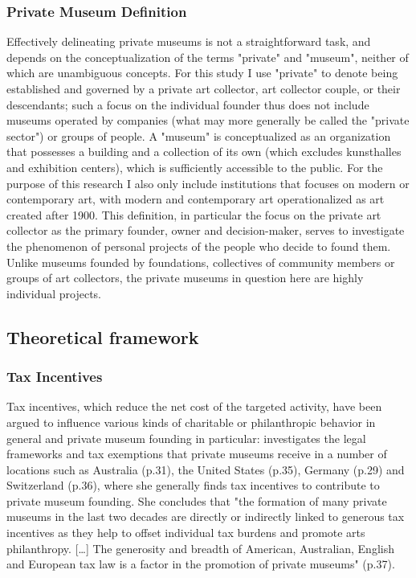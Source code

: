 \documentclass[11pt, authoryear]{elsarticle}
\begin{document}
\subsubsection*{Private Museum Definition}

Effectively delineating private museums is not a straightforward task, and depends on the conceptualization of the terms "private" and "museum", neither of which are unambiguous concepts.
For this study I use "private" to denote being established and governed by a private art collector, art collector couple, or their descendants; such a focus on the individual founder thus does not include museums operated by companies (what may more generally be called the "private sector") or groups of people.
A "museum" is conceptualized as an organization that possesses a building and a collection of its own (which excludes kunsthalles and exhibition centers), which is sufficiently accessible to the public.
For the purpose of this research I also only include institutions that focuses on modern or contemporary art, with modern and contemporary art operationalized as art created after 1900.
This definition, in particular the focus on the private art collector as the primary founder, owner and decision-maker, serves to investigate the phenomenon of personal projects of the people who decide to found them.
Unlike museums founded by foundations, collectives of community members or groups of art collectors, the private museums in question here are highly individual projects.




\subsection*{Theoretical framework}




\subsubsection*{Tax Incentives}








Tax incentives, which reduce the net cost of the targeted activity, have been argued to influence various kinds of charitable or philanthropic behavior in general \citep{Peloza_Steel_2005_elasticities} and private museum founding in particular: 
\citet{Walker_2019_collector} investigates the legal frameworks and tax exemptions that private museums receive in a number of locations such as Australia (p.31), the United States (p.35), Germany (p.29) and Switzerland (p.36), where she generally finds tax incentives to contribute to private museum founding. 
She concludes that "the formation of many private museums in the last two decades are directly or indirectly linked to generous tax incentives as they help to offset individual tax burdens and promote arts philanthropy. [\ldots{}] The generosity and breadth of American, Australian, English and European tax law is a factor in the promotion of private museums" (p.37).
\end{document}
